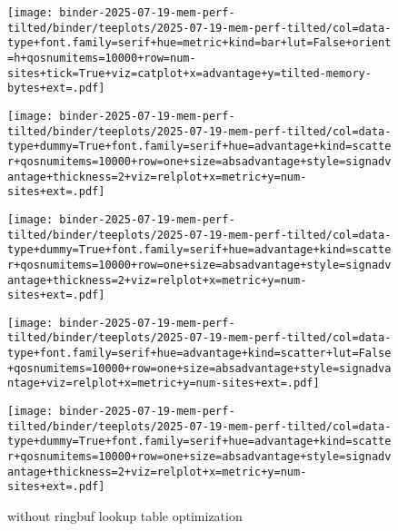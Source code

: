 \begin{figure*}

\begin{subfigure}{\textwidth}
\texttt{[image: binder-2025-07-19-mem-perf-tilted/binder/teeplots/2025-07-19-mem-perf-tilted/col=data-type+font.family=serif+hue=metric+kind=bar+lut=False+orient=h+qosnumitems=10000+row=num-sites+tick=True+viz=catplot+x=advantage+y=tilted-memory-bytes+ext=.pdf]}

\vspace{-1ex}

\texttt{[image: binder-2025-07-19-mem-perf-tilted/binder/teeplots/2025-07-19-mem-perf-tilted/col=data-type+dummy=True+font.family=serif+hue=advantage+kind=scatter+qosnumitems=10000+row=one+size=absadvantage+style=signadvantage+thickness=2+viz=relplot+x=metric+y=num-sites+ext=.pdf]}

\vspace{-3ex}

\texttt{[image: binder-2025-07-19-mem-perf-tilted/binder/teeplots/2025-07-19-mem-perf-tilted/col=data-type+dummy=True+font.family=serif+hue=advantage+kind=scatter+qosnumitems=10000+row=one+size=absadvantage+style=signadvantage+thickness=2+viz=relplot+x=metric+y=num-sites+ext=.pdf]}

\vspace{-1.2ex}

\texttt{[image: binder-2025-07-19-mem-perf-tilted/binder/teeplots/2025-07-19-mem-perf-tilted/col=data-type+font.family=serif+hue=advantage+kind=scatter+lut=False+qosnumitems=10000+row=one+size=absadvantage+style=signadvantage+viz=relplot+x=metric+y=num-sites+ext=.pdf]}

\vspace{-2.8ex}

\texttt{[image: binder-2025-07-19-mem-perf-tilted/binder/teeplots/2025-07-19-mem-perf-tilted/col=data-type+dummy=True+font.family=serif+hue=advantage+kind=scatter+qosnumitems=10000+row=one+size=absadvantage+style=signadvantage+thickness=2+viz=relplot+x=metric+y=num-sites+ext=.pdf]}

\vspace{-0.75ex}

\caption{\footnotesize without ringbuf lookup table optimization}
\label{fig:mem-perf-tilted:nolut}
\end{subfigure}


\end{figure*}

